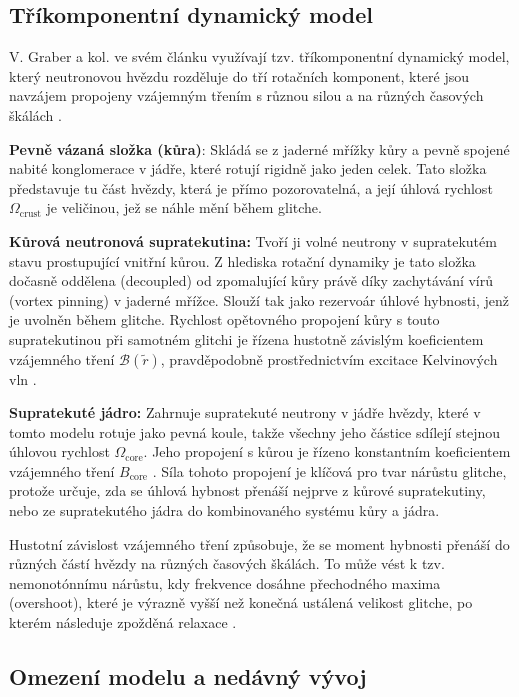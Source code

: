 \documentclass[%
final%
,htext%
]{ipothes}
\begin{document}
\subsection{Tříkomponentní dynamický model}
V. Graber a kol. ve svém článku využívají tzv. tříkomponentní dynamický model, který neutronovou hvězdu rozděluje do tří rotačních komponent, které jsou navzájem propojeny vzájemným třením s různou silou a na různých časových škálách \cite{graber2018}.

\textbf{Pevně vázaná složka (kůra)}: Skládá se z jaderné mřížky kůry a pevně spojené nabité konglomerace v jádře, které rotují rigidně jako jeden celek. Tato složka představuje tu část hvězdy, která je přímo pozorovatelná, a její úhlová rychlost $\Omega_{\text{crust}}$ je veličinou, jež se náhle mění během glitche.

\textbf{Kůrová neutronová supratekutina:} Tvoří ji volné neutrony v supratekutém stavu prostupující vnitřní kůrou. Z hlediska rotační dynamiky je tato složka dočasně oddělena (decoupled) od zpomalující kůry právě díky zachytávání vírů (vortex pinning) v jaderné mřížce. Slouží tak jako rezervoár úhlové hybnosti, jenž je uvolněn během glitche. Rychlost opětovného propojení kůry s touto supratekutinou při samotném glitchi je řízena hustotně závislým koeficientem vzájemného tření $\mathcal{B}(\tilde{r})$, pravděpodobně prostřednictvím excitace Kelvinových vln \cite{graber2018}.

\textbf{Supratekuté jádro:} Zahrnuje supratekuté neutrony v jádře hvězdy, které v tomto modelu rotuje jako pevná koule, takže všechny jeho částice sdílejí stejnou úhlovou rychlost $\Omega_{\text{core}}$. Jeho propojení s kůrou je řízeno konstantním koeficientem vzájemného tření $B_{\text{core}}$ \cite{graber2018}. Síla tohoto propojení je klíčová pro tvar nárůstu glitche, protože určuje, zda se úhlová hybnost přenáší nejprve z kůrové supratekutiny, nebo ze supratekutého jádra do kombinovaného systému kůry a jádra. 

Hustotní závislost vzájemného tření způsobuje, že se moment hybnosti přenáší do různých částí hvězdy na různých časových škálách. To může vést k tzv. nemonotónnímu nárůstu, kdy frekvence dosáhne přechodného maxima (overshoot), které je výrazně vyšší než konečná ustálená velikost glitche, po kterém následuje zpožděná relaxace \cite{graber2018}.

\subsection{Omezení modelu a nedávný vývoj}
\end{document}
